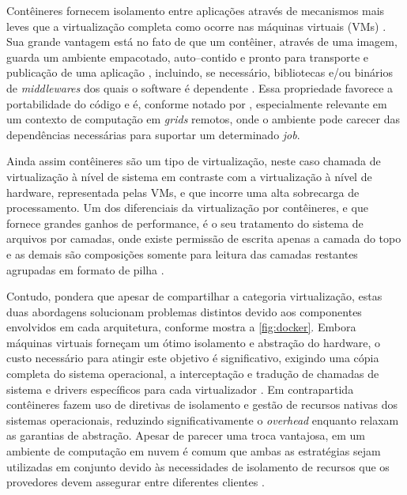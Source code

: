 \documentclass[english,brazilian]{UNISINOSmonografia} %
\begin{document}
Contêineres fornecem isolamento entre aplicações através de mecanismos mais leves que a virtualização completa como ocorre nas máquinas virtuais (VMs) \cite{Awada2017}.
Sua grande vantagem está no fato de que um contêiner, através de uma imagem, guarda um ambiente empacotado, auto--contido e pronto para transporte e publicação de uma aplicação \cite{Pahl2015a}, incluindo, se necessário, bibliotecas e/ou binários de \textit{middlewares} dos quais o software é dependente \cite{Awada2017}.
Essa propriedade favorece a portabilidade do código e é, conforme notado por , especialmente relevante em um contexto de computação em \textit{grids} remotos, onde o ambiente pode carecer das dependências necessárias para suportar um determinado \textit{job}.


Ainda assim contêineres são um tipo de virtualização, neste caso chamada de virtualização à nível de sistema \cite{Tosatto2015} em contraste com a virtualização à nível de hardware, representada pelas VMs, e que incorre uma alta sobrecarga de processamento.
Um dos diferenciais da virtualização por contêineres, e que fornece grandes ganhos de performance, é o seu tratamento do sistema de arquivos por camadas, onde existe permissão de escrita apenas a camada do topo e as demais são composições somente para leitura das camadas restantes agrupadas em formato de pilha \cite{Higgins2015}.



Contudo,  pondera que apesar de compartilhar a categoria virtualização, estas duas abordagens solucionam problemas distintos devido aos componentes envolvidos em cada arquitetura, conforme mostra a \autoref{fig:docker}.
Embora máquinas virtuais forneçam um ótimo isolamento e abstração do hardware, o custo necessário para atingir este objetivo é significativo, exigindo uma cópia completa do sistema operacional, a interceptação e tradução de chamadas de sistema e drivers específicos para cada virtualizador \cite{Felter2015}.
Em contrapartida contêineres fazem uso de diretivas de isolamento e gestão de recursos nativas dos sistemas operacionais, reduzindo significativamente o \textit{overhead} enquanto relaxam as garantias de abstração.
Apesar de parecer uma troca vantajosa, em um ambiente de computação em nuvem é comum que ambas as estratégias sejam utilizadas em conjunto devido às necessidades de isolamento de recursos que os provedores devem assegurar entre diferentes clientes \cite{Bernstein2014}.
\end{document}
